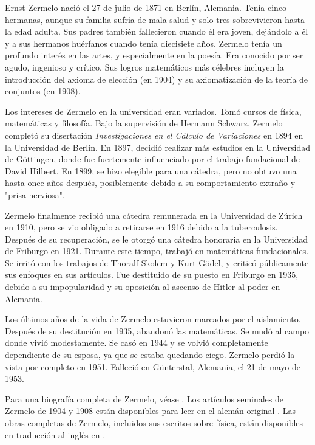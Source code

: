 \documentclass[../../../include/open-logic-section]{subfiles}
\begin{document}



Ernst Zermelo nació el 27 de julio de 1871 en Berlín, Alemania. Tenía cinco hermanas, aunque su familia sufría de mala salud y solo tres sobrevivieron hasta la edad adulta. Sus padres también fallecieron cuando él era joven, dejándolo a él y a sus hermanos huérfanos cuando tenía diecisiete años. Zermelo tenía un profundo interés en las artes, y especialmente en la poesía. Era conocido por ser agudo, ingenioso y crítico. Sus logros matemáticos más célebres incluyen la introducción del axioma de elección (en 1904) y su axiomatización de la teoría de conjuntos (en 1908).

Los intereses de Zermelo en la universidad eran variados. Tomó cursos de física, matemáticas y filosofía. Bajo la supervisión de Hermann Schwarz, Zermelo completó su disertación \emph{Investigaciones en el Cálculo de Variaciones} en 1894 en la Universidad de Berlín. En 1897, decidió realizar más estudios en la Universidad de G\"{o}ttingen, donde fue fuertemente influenciado por el trabajo fundacional de David Hilbert. En 1899, se hizo elegible para una cátedra, pero no obtuvo una hasta once años después, posiblemente debido a su comportamiento extraño y "prisa nerviosa".

Zermelo finalmente recibió una cátedra remunerada en la Universidad de Zúrich en 1910, pero se vio obligado a retirarse en 1916 debido a la tuberculosis. Después de su recuperación, se le otorgó una cátedra honoraria en la Universidad de Friburgo en 1921. Durante este tiempo, trabajó en matemáticas fundacionales. Se irritó con los trabajos de Thoralf Skolem y Kurt G\"{o}del, y criticó públicamente sus enfoques en sus artículos. Fue destituido de su puesto en Friburgo en 1935, debido a su impopularidad y su oposición al ascenso de Hitler al poder en Alemania.

Los últimos años de la vida de Zermelo estuvieron marcados por el aislamiento. Después de su destitución en 1935, abandonó las matemáticas. Se mudó al campo donde vivió modestamente. Se casó en 1944 y se volvió completamente dependiente de su esposa, ya que se estaba quedando ciego. Zermelo perdió la vista por completo en 1951. Falleció en G\"{u}nterstal, Alemania, el 21 de mayo de 1953.

\begin{reading}
Para una biografía completa de Zermelo, véase \citet{Ebbinghaus2015}. Los artículos seminales de Zermelo de 1904 y 1908 están disponibles para leer en el alemán original \citep{Zermelo1904,Zermelo1908}. Las obras completas de Zermelo, incluidos sus escritos sobre física, están disponibles en traducción al inglés en \citep{Ebbinghaus2010,Ebbinghaus2013}.
\end{reading}
\end{document}
